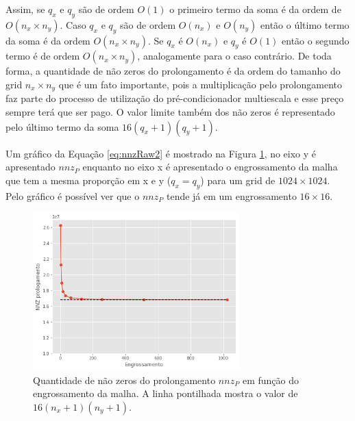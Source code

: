 Assim, se $q_x$ e $q_y$ são de ordem $O(1)$ o primeiro termo da soma é da ordem de $O(n_x \times n_y)$. Caso $q_x$ e $q_y$ são de ordem $O(n_x)$ e $O(n_y)$ então o último termo da soma é da ordem $O(n_x \times n_y )$.
Se $q_x$ é $O(n_x)$ e $q_y$ é $O(1)$ então o segundo termo é de ordem $O(n_x \times n_y)$, analogamente para o caso contrário.
De toda forma, a quantidade de não zeros do prolongamento é da ordem do tamanho do grid $n_x \times n_y$ que é um fato importante, pois a multiplicação pelo prolongamento faz parte do processo de utilização do pré-condicionador multiescala e esse preço sempre terá que ser pago. O valor limite também dos não zeros é representado pelo último termo da soma $16(q_x+1)(q_y+1)$.

Um gráfico da Equação \eqref{eq:nnzRaw2} é mostrado na Figura \ref{fig:nnzGrafico}, no eixo y é apresentado $nnz_P$ enquanto no eixo x é apresentado o engrossamento da malha que tem a mesma proporção em x e y ($q_x  = q_y$) para um grid de $1024 \times 1024$. Pelo gráfico é possível ver que o $nnz_P$ tende já em um engrossamento $16 \times 16$.


\begin{figure}[!htbp]
\centering
\includegraphics[width=8cm]{chap06/figs/nnzProlongamento.png}
\caption{Quantidade de não zeros do prolongamento $nnz_P$  em função do engrossamento da malha. A linha pontilhada mostra o valor de $16(n_x+1)(n_y+1)$.}
\label{fig:nnzGrafico}
\end{figure}
